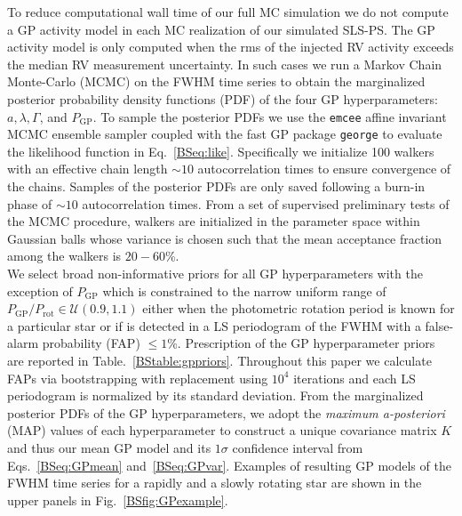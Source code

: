 To reduce computational wall time of our full MC simulation
we do not compute a GP activity model in each MC realization of our simulated
SLS-PS. The GP activity model is only computed when the rms of the injected RV activity exceeds the median RV measurement
uncertainty. In such cases we run a Markov Chain Monte-Carlo
(MCMC) on the FWHM time series to obtain the marginalized posterior probability density functions (PDF)
of the four GP hyperparameters: $a,\lambda,\Gamma$, and $P_{\text{GP}}$.
To sample the posterior PDFs we use the \texttt{emcee} affine invariant
MCMC ensemble sampler \citep{foremanmackey13} coupled with the fast GP package \texttt{george} 
\citep{ambikasaran15} to evaluate the likelihood function in Eq.~\ref{BSeq:like}.
Specifically we initialize 100 walkers with an effective chain length
$\sim 10$ autocorrelation times to ensure convergence of the chains.
Samples of the posterior PDFs are only saved following a burn-in phase of $\sim 10$ autocorrelation times.
From a set of supervised preliminary tests of the MCMC procedure, walkers are initialized in the
parameter space within Gaussian balls whose variance is chosen such that the mean acceptance fraction among
the walkers is $20-60$\%. \\

We select broad non-informative priors for all GP hyperparameters with the
exception of $P_{\text{GP}}$ which is constrained to the narrow uniform range of
$P_{\text{GP}}/P_{\text{rot}} \in \mathcal{U}(0.9,1.1)$ either when the photometric rotation period is known for a
particular star or if \prot{} is detected in a LS periodogram
of the FWHM with a false-alarm probability (FAP) $\le 1$\%. Prescription of the GP hyperparameter priors are
reported in Table.~\ref{BStable:gppriors}. Throughout this paper we calculate FAPs via
bootstrapping with replacement using $10^4$ iterations and each LS periodogram is normalized by its standard
deviation. From the marginalized posterior PDFs of the GP hyperparameters, we adopt the \emph{maximum a-posteriori}
(MAP) values of each hyperparameter to construct a unique covariance matrix $K$ and thus our mean GP model
and its $1\sigma$ confidence interval from Eqs.~\ref{BSeq:GPmean} and~\ref{BSeq:GPvar}. Examples of resulting
GP models of the FWHM time series for a rapidly and a slowly rotating star are shown in the upper panels in
Fig.~\ref{BSfig:GPexample}. \\





